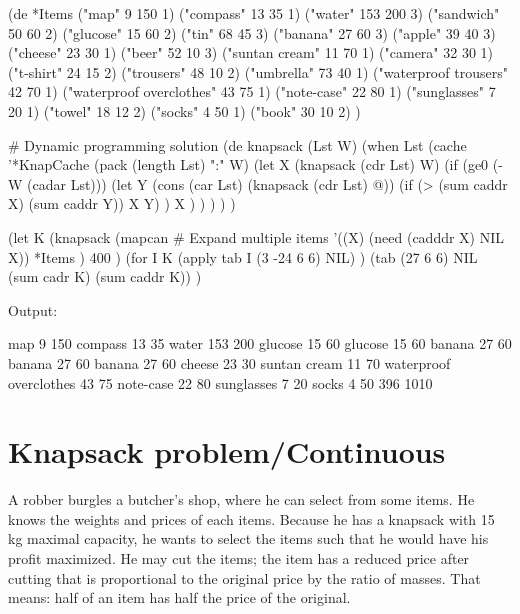 \begin{wideverbatim}

(de *Items
   ("map" 9 150 1)                     ("compass" 13 35 1)
   ("water" 153 200 3)                 ("sandwich" 50 60 2)
   ("glucose" 15 60 2)                 ("tin" 68 45 3)
   ("banana" 27 60 3)                  ("apple" 39 40 3)
   ("cheese" 23 30 1)                  ("beer" 52 10 3)
   ("suntan cream" 11 70 1)            ("camera" 32 30 1)
   ("t-shirt" 24 15 2)                 ("trousers" 48 10 2)
   ("umbrella" 73 40 1)                ("waterproof trousers" 42 70 1)
   ("waterproof overclothes" 43 75 1)  ("note-case" 22 80 1)
   ("sunglasses" 7 20 1)               ("towel" 18 12 2)
   ("socks" 4 50 1)                    ("book" 30 10 2) )

# Dynamic programming solution
(de knapsack (Lst W)
   (when Lst
      (cache '*KnapCache (pack (length Lst) ":" W)
         (let X (knapsack (cdr Lst) W)
            (if (ge0 (- W (cadar Lst)))
               (let Y (cons (car Lst) (knapsack (cdr Lst) @))
                  (if (> (sum caddr X) (sum caddr Y)) X Y) )
               X ) ) ) ) )

(let K
   (knapsack
      (mapcan                                   # Expand multiple items
         '((X) (need (cadddr X) NIL X))
         *Items )
      400 )
   (for I K
      (apply tab I (3 -24 6 6) NIL) )
   (tab (27 6 6) NIL (sum cadr K) (sum caddr K)) )

Output:

   map                          9   150
   compass                     13    35
   water                      153   200
   glucose                     15    60
   glucose                     15    60
   banana                      27    60
   banana                      27    60
   banana                      27    60
   cheese                      23    30
   suntan cream                11    70
   waterproof overclothes      43    75
   note-case                   22    80
   sunglasses                   7    20
   socks                        4    50
                              396  1010

\end{wideverbatim}

\pagebreak{}
\section*{Knapsack problem/Continuous}

A robber burgles a butcher's shop, where he can select from some items.
He knows the weights and prices of each items. Because he has a knapsack
with 15 kg maximal capacity, he wants to select the items such that he
would have his profit maximized. He may cut the items; the item has a
reduced price after cutting that is proportional to the original price
by the ratio of masses. That means: half of an item has half the price
of the original.


